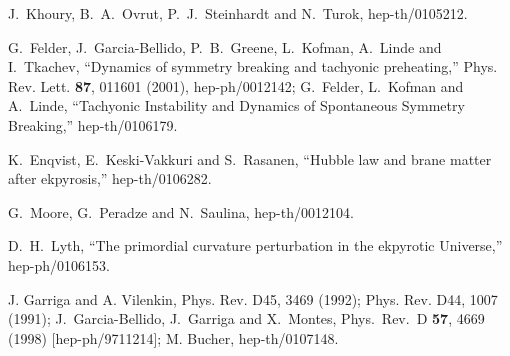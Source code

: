 \documentclass[a4paper,12pt]{article}
\begin{document}
\begin{thebibliography}{99}
   
J.~Khoury, B.~A.~Ovrut, P.~J.~Steinhardt and N.~Turok, hep-th/0105212.   
   
  
   
  G.~Felder, J.~Garcia-Bellido, P.~B.~Greene, L.~Kofman,   
A.~Linde and I.~Tkachev,   
 ``Dynamics of symmetry breaking and tachyonic preheating,'' Phys. Rev. Lett. {\bf 87}, 011601 (2001),   
hep-ph/0012142; G.~Felder, L.~Kofman and A.~Linde, ``Tachyonic Instability   
and Dynamics of Spontaneous Symmetry Breaking,'' hep-th/0106179.   
  
 
K.~Enqvist, E.~Keski-Vakkuri and S.~Rasanen,
``Hubble law and brane matter after ekpyrosis,''
hep-th/0106282.

   
   
G.~Moore, G.~Peradze and N.~Saulina,  hep-th/0012104.   

    
   
D.~H.~Lyth, ``The primordial curvature perturbation in the ekpyrotic   
Universe,'' hep-ph/0106153.   
   
   
   
   
   
   
   



 

J. Garriga and A. Vilenkin, Phys. Rev. D45, 3469 (1992);  Phys. Rev. D44, 1007 (1991); J.~Garcia-Bellido, J.~Garriga and X.~Montes,
Phys.\ Rev.\ D {\bf 57}, 4669 (1998)
[hep-ph/9711214]; M. Bucher, hep-th/0107148.


\end{thebibliography}
\end{document}
